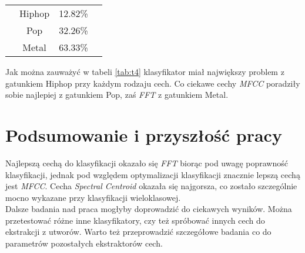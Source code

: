 \documentclass[10pt,a4paper]{article}
\begin{document}
\begin{table}[h]
\begin{tabular}{cccc}
                                                                             & Hiphop                               & 12.82\%                          &                                \\
                                                                             & Pop                                  & 32.26\%                          &                                \\
                                                                             & Metal                                & 63.33\%                          &                                \\ \hline
\end{tabular}
\end{table}

Jak można zauważyć w tabeli \ref{tab:t4} klasyfikator miał największy problem z gatunkiem Hiphop przy każdym rodzaju cech. Co ciekawe cechy \textit{MFCC} poradziły sobie najlepiej z gatunkiem Pop, zaś \textit{FFT} z gatunkiem Metal.

\section{Podsumowanie i przyszłość pracy}
Najlepszą cechą do klasyfikacji okazało się \textit{FFT} biorąc pod uwagę poprawność klasyfikacji, jednak pod względem optymalizacji klasyfikacji znacznie lepszą cechą jest \textit{MFCC}. Cecha \textit{Spectral Centroid} okazała się najgorsza, co zostało szczególnie mocno wykazane przy klasyfikacji wieloklasowej.\\
\indent Dalsze badania nad praca mogłyby doprowadzić do ciekawych wyników. Można przetestować różne inne klasyfikatory, czy też spróbować innych cech do ekstrakcji z utworów. Warto też przeprowadzić szczegółowe badania co do parametrów pozostałych ekstraktorów cech.
\end{document}
